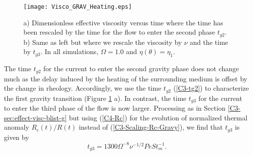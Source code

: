 \begin{figure}[h!]
  \begin{center}
    \graphicspath{ {/Users/thorey/Documents/These/Projet/Refroidissement/Skin_Model/Figure/Figure_Heating/} }
    \texttt{[image: Visco\_GRAV\_Heating.eps]}
    \caption{a)  Dimensionless effective  viscosity versus  time where
      the time has been rescaled by the time for the flow to enter the
      second phase $t_{g2}$. b) Same as  left but where we rescale the
      viscosity  by   $\nu$  and  the   time  by  $t_{g3}$.    In  all
      simulations, $\Omega=1.0$ and $\eta(\theta)=\eta_1$.}
    \label{C4-Visco_GRAV_Heating}
  \end{center}
\end{figure}

The time  $t_{g2}$ for the current  to enter the second  gravity phase
does  not change  much as  the  delay induced  by the  heating of  the
surrounding medium is offset by  the change in rheology.  Accordingly,
we  use the  time $t_{g2}$  (\ref{C3-tg2}) to  characterize the  first
gravity   transition  (Figure   \ref{C4-Visco_GRAV_Heating}  a).    In
contrast, the time  $t_{g3}$ for the current to enter  the third phase
of   the   flow   is   now   larger.    Processing   as   in   Section
\ref{C3-sec:effect-visc-blist-g}  but  using   (\ref{C4-Rc})  for  the
evolution  of  normalized  thermal anomaly  $R_c(t)/R(t)$  instead  of
(\ref{C3-Scaling-Rc-Gravy}), we find that $t_{g3}$ is given by
\begin{equation}
  t_{g3}= 1300 \Omega^{-8}\nu^{-1/2}Pe St_m^{-1}.
  \label{C4-tg3}
\end{equation}

